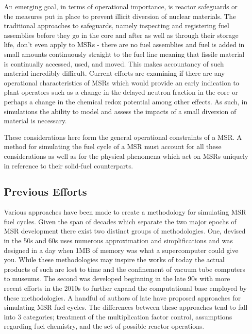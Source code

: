 An emerging goal, in terms of operational importance, is reactor safeguards or
the measures put in place to prevent illicit diversion of nuclear materials.
The traditional approaches to safeguards, namely inspecting and registering
fuel assemblies before they go in the core and after as well as through their
storage life, don't even apply to MSRs - there are no fuel assemblies and fuel
is added in small amounts continuously straight to the fuel line meaning that
fissile material is continually accessed, used, and moved. This makes
accountancy of such material incredibly difficult. Current efforts are examining
if there are any operational characteristics of MSRs which would provide an
early indication to plant operators such as a change in the delayed neutron
fraction in the core or perhaps a change in the chemical redox potential among
other effects. As such, in simulations the ability to model and assess the
impacts of a small diversion of material is necessary.

These considerations here form the general operational constraints of a MSR. A
method for simulating the fuel cycle of a MSR must account for all these
considerations as well as for the physical phenomena which act on MSRs
uniquely in reference to their solid-fuel counterparts.

\subsection{Previous Efforts}\label{ssec:efforts}

Various approaches have been made to create a methodology for simulating MSR
fuel cycles. Given the span of decades which separate the two major epochs of
MSR development there exist two distinct groups of methodologies. One, devised
in the 50s and 60s uses numerous approximation and simplifications and was
designed in a day when 1MB of memory was what a supercomputer could give you.
While these methodologies may inspire the works of today the actual products of
such are lost to time and the confinement of vacuum tube computers to museums.
The second was developed beginning in the late 90s with more recent efforts in
the 2010s to further expand the computational base employed by these
methodologies. A handful of authors of late have proposed approaches for
simulating MSR fuel cycles. The differences between these approaches tend to
fall into 3 categories; treatment of the multiplication factor control,
assumptions regarding fuel chemistry, and the set of possible reactor
operations.

